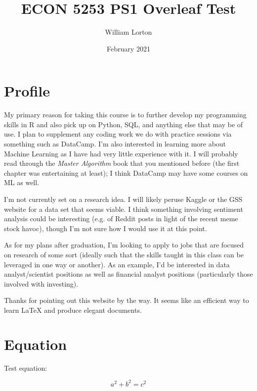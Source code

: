 \documentclass{article}
\title{ECON 5253 PS1 Overleaf Test}
\author{William Lorton}
\date{February 2021}
\begin{document}
\maketitle

\section{Profile}

My primary reason for taking this course is to further develop my programming skills in R and also pick up on Python, SQL, and anything else that may be of use. I plan to supplement any coding work we do with practice sessions via something such as DataCamp. I'm also interested in learning more about Machine Learning as  I have had very little experience with it. I will probably read through the \emph{Master Algorithm} book that you mentioned before (the first chapter was entertaining at least); I think DataCamp may have some courses on ML as well.

\medskip

I'm not currently set on a research idea. I will likely peruse Kaggle or the GSS website for a data set that seems viable. I think something involving sentiment analysis could be interesting (e.g. of Reddit posts in light of the recent meme stock havoc), though I'm not sure how I would use it at this point.

\medskip

As for my plans after graduation, I'm looking to apply to jobs that are focused on research of some sort (ideally such that the skills taught in this class can be leveraged in one way or another). As an example, I'd be interested in data analyst/scientist positions as well as financial analyst positions (particularly those involved with investing). 

\medskip

Thanks for pointing out this website by the way. It seems like an efficient way to learn LaTeX and produce elegant documents.

\section{Equation}

Test equation:

\begin{displaymath}
a^2 + b^2 = c^2 
\end{displaymath}
\end{document}
